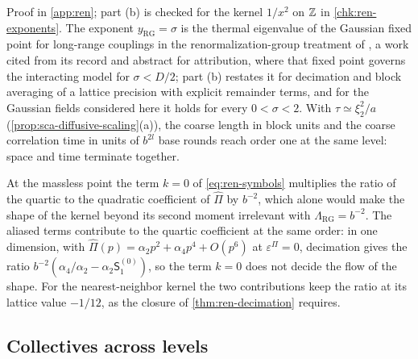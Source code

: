 Proof in \cref{app:ren}; part (b) is checked for the kernel $1/x^2$ on $\mathbb{Z}$ in \cref{chk:ren-exponents}. The exponent $y_{\mathrm{RG}}=\sigma$ is the thermal eigenvalue of the Gaussian fixed point for long-range couplings in the renormalization-group treatment of \citet{fisher1972critical}, a work cited from its record and abstract for attribution, where that fixed point governs the interacting model for $\sigma<D/2$; part (b) restates it for decimation and block averaging of a lattice precision with explicit remainder terms, and for the Gaussian fields considered here it holds for every $0<\sigma<2$. With $\tau\simeq\xi_2^2/a$ (\cref{prop:sca-diffusive-scaling}(a)), the coarse length in block units and the coarse correlation time in units of $b^{2l}$ base rounds reach order one at the same level: space and time terminate together.

\begin{remark}\label{rem:ren-quartic}
At the massless point the term $k=0$ of \eqref{eq:ren-symbols} multiplies the ratio of the quartic to the quadratic coefficient of $\hat\Pi$ by $b^{-2}$, which alone would make the shape of the kernel beyond its second moment irrelevant with $\Lambda_{\mathrm{RG}}=b^{-2}$. The aliased terms contribute to the quartic coefficient at the same order: in one dimension, with $\hat\Pi(p)=\alpha_2p^2+\alpha_4p^4+O(p^6)$ at $\varepsilon^\Pi=0$, decimation gives the ratio $b^{-2}(\alpha_4/\alpha_2-\alpha_2\mathsf S^{(0)}_1)$, so the term $k=0$ does not decide the flow of the shape. For the nearest-neighbor kernel the two contributions keep the ratio at its lattice value $-1/12$, as the closure of \cref{thm:ren-decimation} requires.
\end{remark}

\subsection{Collectives across levels}\label{sup:ren-collectives-across-levels}

